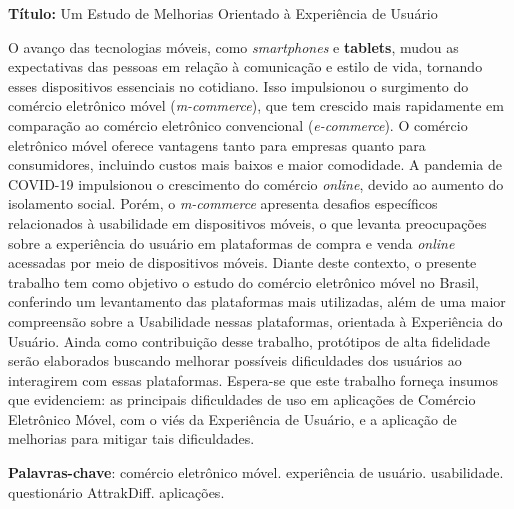 \begin{resumo}
    \textbf{Título:} Um Estudo de Melhorias Orientado à Experiência de Usuário

    O avanço das tecnologias móveis, como \textit{smartphones} e \textbf{tablets}, mudou as expectativas das pessoas em relação à comunicação e estilo de vida, tornando esses dispositivos essenciais no cotidiano. Isso impulsionou o surgimento do comércio eletrônico móvel (\textit{m-commerce}), que tem crescido mais rapidamente em comparação ao comércio eletrônico convencional (\textit{e-commerce}). O comércio eletrônico móvel oferece vantagens tanto para empresas quanto para consumidores, incluindo custos mais baixos e maior comodidade. A pandemia de COVID-19 impulsionou o crescimento do comércio \textit{online}, devido ao aumento do isolamento social. Porém, o \textit{m-commerce} apresenta desafios específicos relacionados à usabilidade em dispositivos móveis, o que levanta preocupações sobre a experiência do usuário em plataformas de compra e venda \textit{online} acessadas por meio de dispositivos móveis. Diante deste contexto, o presente trabalho tem como objetivo o estudo do comércio eletrônico móvel no Brasil, conferindo um levantamento das plataformas mais utilizadas, além de uma maior compreensão sobre a Usabilidade nessas plataformas, orientada à Experiência do Usuário. Ainda como contribuição desse trabalho, protótipos de alta fidelidade serão elaborados buscando melhorar possíveis dificuldades dos usuários ao interagirem com essas plataformas. Espera-se que este trabalho forneça insumos que evidenciem: as principais dificuldades de uso em aplicações de Comércio Eletrônico Móvel, com o viés da Experiência de Usuário, e a aplicação de melhorias para mitigar tais dificuldades.

    \vspace{\onelineskip}
    
    \noindent
    \textbf{Palavras-chave}: comércio eletrônico móvel. experiência de usuário. usabilidade. questionário AttrakDiff. aplicações.

\end{resumo}
